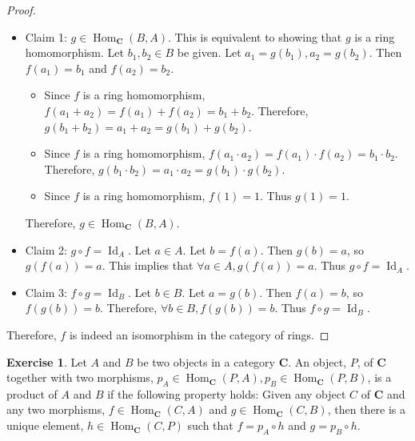 \documentclass[12pt, psamsfonts]{amsart}
\theoremstyle{definition}
\newtheorem{exer}[thm]{Exercise}
\theoremstyle{remark}
\DeclareMathOperator{\Hom}{Hom}
\DeclareMathOperator{\Id}{Id}
\numberwithin{equation}{section}
\begin{document}
\begin{proof}
\begin{itemize}
  \item
    Claim 1: $g \in \Hom_{\mathbf{C}}(B, A)$.
    This is equivalent to showing that $g$ is a ring homomorphism.
    Let $b_1, b_2 \in B$ be given.
    Let $a_1 = g(b_1), a_2 = g(b_2)$.
    Then $f(a_1) = b_1$ and $f(a_2) = b_2$.
    \begin{itemize}
      \item
        Since $f$ is a ring homomorphism, $f(a_1 + a_2) = f(a_1) + f(a_2) = b_1 + b_2$.
        Therefore, $g(b_1 + b_2) = a_1 + a_2 = g(b_1) + g(b_2)$.
      \item
        Since $f$ is a ring homomorphism, $f(a_1 \cdot a_2) = f(a_1) \cdot f(a_2) = b_1 \cdot b_2$.
        Therefore, $g(b_1 \cdot b_2) = a_1 \cdot a_2 = g(b_1) \cdot g(b_2)$.
      \item
        Since $f$ is a ring homomorphism, $f(1) = 1$.
        Thus $g(1) = 1$.
    \end{itemize}
    Therefore, $g \in \Hom_{\mathbf{C}}(B, A)$.
  \item
    Claim 2: $ g \circ f = \Id_A$.
    Let $a \in A$.
    Let $b = f(a)$.
    Then $g(b) = a$, so $g(f(a)) = a$.
    This implies that $\forall a \in A, g(f(a)) = a$.
    Thus $g \circ f = \Id_A$.
  \item
    Claim 3: $ f \circ g = \Id_B$.
    Let $b \in B$.
    Let $a = g(b)$.
    Then $f(a) = b$, so $f(g(b)) = b$.
    Therefore, $\forall b \in B, f(g(b)) = b$.
    Thus $f \circ g = \Id_B$.
\end{itemize}

Therefore, $f$ is indeed an isomorphism in the category of rings.
\end{proof}

\begin{exer}
  Let $A$ and $B$ be two objects in a category $\mathbf{C}$.
  An object, $P$, of $\mathbf{C}$ together with two morphisms, $p_A \in \Hom_{\mathbf{C}}(P, A), p_B \in \Hom_{\mathbf{C}}(P, B)$, is a product of $A$ and $B$ if the following property holds:
  Given any object $C$ of $\mathbf{C}$ and any two morphisms, $f \in \Hom_{\mathbf{C}}(C, A)$ and $g \in \Hom_{\mathbf{C}}(C, B)$, then there is a unique element, $h \in \Hom_{\mathbf{C}}(C, P)$ such that $f = p_A \circ h$ and $g = p_B \circ h$.
\end{exer}
\end{document}
